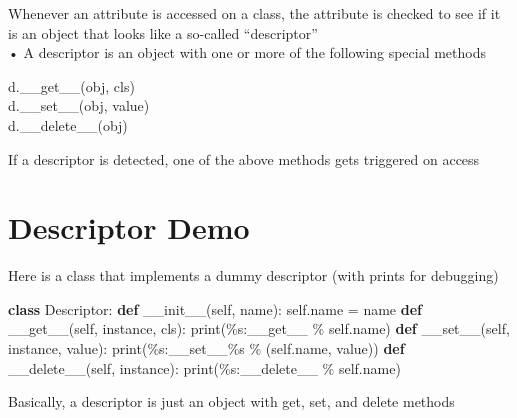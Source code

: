 \documentclass[
  letterpaper,
  DIV=11,
  numbers=noendperiod]{scrreprt}
\newenvironment{Shaded}{\begin{snugshade}}{\end{snugshade}}
\newcommand{\BuiltInTok}[1]{\textcolor[rgb]{0.00,0.23,0.31}{#1}}
\newcommand{\FunctionTok}[1]{\textcolor[rgb]{0.28,0.35,0.67}{#1}}
\newcommand{\KeywordTok}[1]{\textcolor[rgb]{0.00,0.23,0.31}{\textbf{#1}}}
\newcommand{\NormalTok}[1]{\textcolor[rgb]{0.00,0.23,0.31}{#1}}
\newcommand{\OperatorTok}[1]{\textcolor[rgb]{0.37,0.37,0.37}{#1}}
\newcommand{\SpecialCharTok}[1]{\textcolor[rgb]{0.37,0.37,0.37}{#1}}
\newcommand{\StringTok}[1]{\textcolor[rgb]{0.13,0.47,0.30}{#1}}
\newcommand{\VariableTok}[1]{\textcolor[rgb]{0.07,0.07,0.07}{#1}}
\begin{document}
Whenever an attribute is accessed on a class, the attribute is checked
to see if it is an object that looks like a so-called ``descriptor''\\
• A descriptor is an object with one or more of the following special
methods

d.\_\_get\_\_(obj, cls)\\
d.\_\_set\_\_(obj, value)\\
d.\_\_delete\_\_(obj)

If a descriptor is detected, one of the above methods gets triggered on
access


\chapter{Descriptor Demo}\label{descriptor-demo}

Here is a class that implements a dummy descriptor (with prints for
debugging)

\begin{Shaded}
\begin{Highlighting}[]
\KeywordTok{class}\NormalTok{ Descriptor: }\KeywordTok{def} \FunctionTok{\_\_init\_\_}\NormalTok{(}\VariableTok{self}\NormalTok{, name): }\VariableTok{self}\NormalTok{.name }\OperatorTok{=}\NormalTok{ name }\KeywordTok{def} \FunctionTok{\_\_get\_\_}\NormalTok{(}\VariableTok{self}\NormalTok{, instance, cls): }\BuiltInTok{print}\NormalTok{(}\StringTok{\textquotesingle{}}\SpecialCharTok{\%s}\StringTok{:\_\_get\_\_\textquotesingle{}} \OperatorTok{\%} \VariableTok{self}\NormalTok{.name) }\KeywordTok{def} \FunctionTok{\_\_set\_\_}\NormalTok{(}\VariableTok{self}\NormalTok{, instance, value): }\BuiltInTok{print}\NormalTok{(}\StringTok{\textquotesingle{}}\SpecialCharTok{\%s}\StringTok{:\_\_set\_\_}\SpecialCharTok{\%s}\StringTok{\textquotesingle{}} \OperatorTok{\%}\NormalTok{ (}\VariableTok{self}\NormalTok{.name, value)) }\KeywordTok{def} \FunctionTok{\_\_delete\_\_}\NormalTok{(}\VariableTok{self}\NormalTok{, instance): }\BuiltInTok{print}\NormalTok{(}\StringTok{\textquotesingle{}}\SpecialCharTok{\%s}\StringTok{:\_\_delete\_\_\textquotesingle{}} \OperatorTok{\%} \VariableTok{self}\NormalTok{.name) }
\end{Highlighting}
\end{Shaded}

Basically, a descriptor is just an object with get, set, and delete
methods

\end{document}
